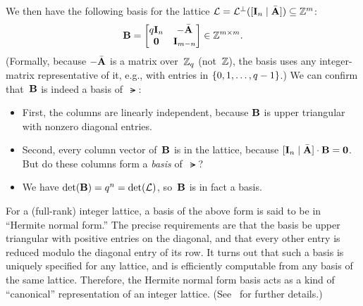 \documentclass[11pt]{article}
\begin{document}
We then have the following basis for the lattice
$\mathcal{L} = \mathcal{L}^{\perp}([\mathbf{I}_{n} \mid \bar{\mathbf{A}}]) \subseteq \mathbb{Z}^{m}$:
\[ \mathbf{B} =
  \begin{bmatrix}
    q\mathbf{I}_n & -\bar{\mathbf{A}} \\
    \mathbf{0} & \mathbf{I}_{m-n}
  \end{bmatrix} \in \mathbb{Z}^{m \times m}.
\]
(Formally, because $-\bar{\mathbf{A}}$ is a matrix over~$\mathbb{Z}_q$ (not~$\mathbb{Z}$),
the basis uses any integer-matrix representative of it, e.g., with
entries in $\{0,1,\ldots,q-1\}$.) We can confirm that~$\mathbf{B}$ is
indeed a basis of~$\lat$:
\begin{itemize}
\item First, the columns are linearly independent, because $\mathbf{B}$ is
  upper triangular with nonzero diagonal entries.
\item Second, every column vector of~$\mathbf{B}$ is in the lattice,
  because $[\mathbf{I}_{n} \mid \bar{\mathbf{A}}] \cdot \mathbf{B} = \mathbf{0}$. But
  do these columns form a \emph{basis} of~$\lat$?
\item We have $\det(\mathbf{B}) = q^{n} = \det(\mathcal{L})$, so~$\mathbf{B}$ is in
  fact a basis.
\end{itemize}

For a (full-rank) integer lattice, a basis of the above form is said
to be in ``Hermite normal form.'' The precise requirements are that
the basis be upper triangular with positive entries on the diagonal,
and that every other entry is reduced modulo the diagonal entry of its
row. It turns out that such a basis is uniquely specified for any
lattice, and is efficiently computable from any basis of the same
lattice. Therefore, the Hermite normal form basis acts as a kind of
``canonical'' representation of an integer lattice.
(See~\cite{DBLP:conf/issac/MicciancioW01,DBLP:conf/calc/Micciancio01}
for further details.)

\end{document}
